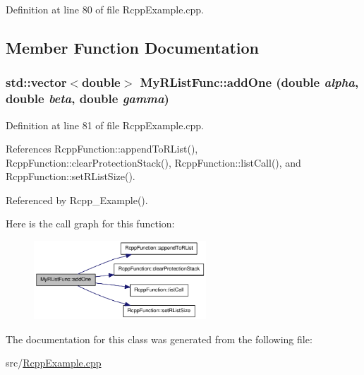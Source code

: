 Definition at line 80 of file RcppExample.cpp.

\subsection{Member Function Documentation}
\hypertarget{classMyRListFunc_a0dec3b59e1e235c0502594a5d92cae13}{
\subsubsection[{addOne}]{\setlength{\rightskip}{0pt plus 5cm}std::vector$<$double$>$ MyRListFunc::addOne (double {\em alpha}, \/  double {\em beta}, \/  double {\em gamma})}}
\label{classMyRListFunc_a0dec3b59e1e235c0502594a5d92cae13}


Definition at line 81 of file RcppExample.cpp.

References RcppFunction::appendToRList(), RcppFunction::clearProtectionStack(), RcppFunction::listCall(), and RcppFunction::setRListSize().

Referenced by Rcpp\_\-Example().

Here is the call graph for this function:\nopagebreak
\begin{figure}[H]
\begin{center}
\leavevmode
\includegraphics[width=183pt]{classMyRListFunc_a0dec3b59e1e235c0502594a5d92cae13_cgraph}
\end{center}
\end{figure}


The documentation for this class was generated from the following file:\begin{DoxyCompactItemize}
\item 
src/\hyperlink{RcppExample_8cpp}{RcppExample.cpp}\end{DoxyCompactItemize}
